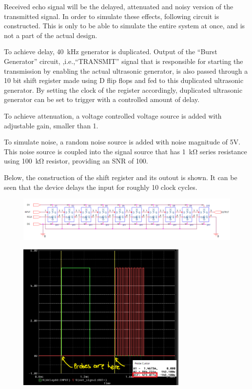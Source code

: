 \documentclass[12pt, a4paper]{article}
\begin{document}
                Received echo signal will be the delayed, attenuated and noisy version of the transmitted signal. In order to simulate these effects, following circuit is constructed. This is only to be able to simulate the entire system at once, and is not a part of the actual design.

                To achieve delay, \SI{40}{\kilo\hertz} generator is duplicated. Output of the ``Burst Generator'' circuit, ,i.e.,``TRANSMIT'' signal that is responsible for starting the transmission by enabling the actual ultrasonic generator, is also passed through a 10 bit shift register made using D flip flops and fed to this duplicated ultrasonic generator. By setting the clock of the register accordingly, duplicated ultrasonic generator can be set to trigger with a controlled amount of delay. 

                To achieve attenuation, a voltage controlled voltage source is added with adjustable gain, smaller than 1.

                To simulate noise, a random noise source is added with noise magnitude of 5V. This noise source is coupled into the signal source that has \SI{1}{\kilo\ohm} series resistance using \SI{100}{\kilo\ohm} resistor, providing an SNR of 100.

                \pagebreak
                Below, the construction of the shift register and its outout is shown. It can be seen that the device delays the input for roughly 10 clock cycles.      

                \begin{figure}[H]\centering
                    \includegraphics[width = \textwidth]{schematics/shifty.png}
                    \caption[]{}
                \end{figure}

                \begin{figure}[H]\centering
                    \includegraphics[width = 0.75\textwidth]{simulations/echo_large.png}
                    \caption[]{}
                \end{figure}
\end{document}
